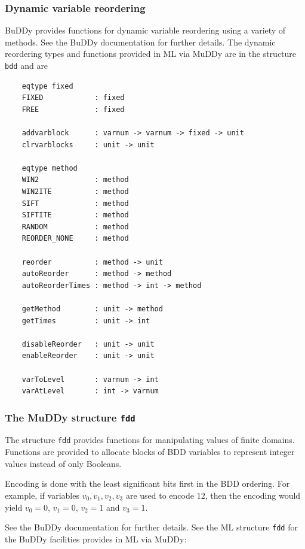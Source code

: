 \documentclass[12pt,fleqn]{book}
\renewcommand{\t}[1]{\mbox{\tt #1}}
\newcommand{\Buddy}{BuDDy{}}
\newcommand{\Muddy}{MuDDy{}}
\begin{document}
\subsubsection{Dynamic variable reordering}

\Buddy{} provides functions for dynamic variable reordering using a variety of methods.
See the \Buddy{} documentation \cite{BuDDy} for further details. The dynamic reordering
types and functions provided in ML via \Muddy{} are in the structure \t{bdd} and are

\begin{verbatim}
    eqtype fixed
    FIXED            : fixed
    FREE             : fixed

    addvarblock      : varnum -> varnum -> fixed -> unit
    clrvarblocks     : unit -> unit

    eqtype method
    WIN2             : method
    WIN2ITE          : method
    SIFT             : method
    SIFTITE          : method
    RANDOM           : method
    REORDER_NONE     : method

    reorder          : method -> unit
    autoReorder      : method -> method
    autoReorderTimes : method -> int -> method

    getMethod        : unit -> method
    getTimes         : unit -> int

    disableReorder   : unit -> unit
    enableReorder    : unit -> unit

    varToLevel       : varnum -> int
    varAtLevel       : int -> varnum
\end{verbatim}

\subsubsection{The \Muddy{} structure \t{fdd}}\label{fdd}

The structure \t{fdd} provides functions for manipulating values of finite domains.
Functions are provided to allocate blocks of BDD variables to represent integer values instead
of only Booleans.

Encoding is done with the least significant bits first in the BDD ordering. For example, if variables
$v_0, v_1, v_2, v_3$ are used to encode $12$, then the encoding would yield
$v_0=0$, $v_1=0$, $v_2=1$ and $v_3=1$.

See the \Buddy{} documentation \cite{BuDDy} for further details. See the ML structure \t{fdd}
for the \Buddy{} facilities provides in ML via \Muddy:
\end{document}

